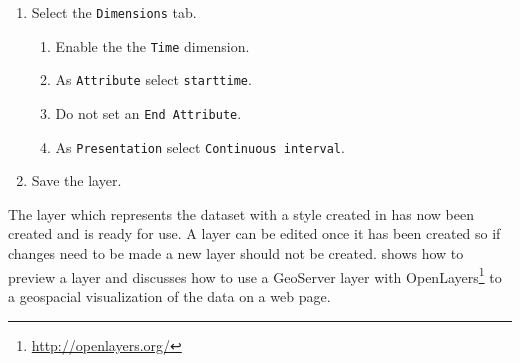 \begin{enumerate}[resume]
	\item Select the \lstinline|Dimensions| tab.
	\begin{enumerate}
		\item Enable the the \lstinline|Time| dimension.
		\item As \lstinline|Attribute| select \lstinline|starttime|.
		\item Do not set an \lstinline|End Attribute|.
		\item As \lstinline|Presentation| select \lstinline|Continuous interval|.
	\end{enumerate}
	\item Save the layer.
\end{enumerate}

The layer which represents the dataset with a style created in
 has now been created and is ready for use. A layer
can be edited once it has been created so if changes need to be made a new
layer should not be created.  shows how to preview a
layer and  discusses how to use a GeoServer layer
with OpenLayers\footnote{\url{http://openlayers.org/}} to a geospacial
visualization of the data on a web page.
